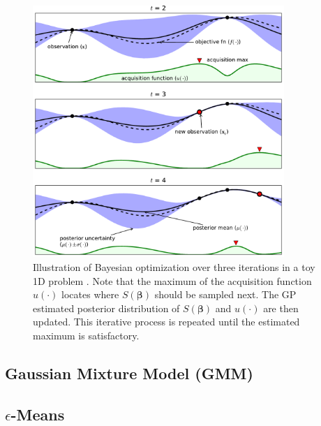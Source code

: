 \begin{figure}
\centering
\includegraphics[width=0.85\textwidth]{figures/ml/toyGPtext3.pdf}
\caption{
Illustration of Bayesian optimization over three iterations in a toy 1D problem \cite{Brochu2010}.
Note that the maximum of the acquisition function $u\left(\cdot\right)$
locates where $S\left(\bm{\beta}\right)$ should be sampled next.
The GP estimated posterior distribution of $S\left(\bm{\beta}\right)$
and $u\left(\cdot\right)$ are then updated.
This iterative process is repeated until the estimated maximum is satisfactory.
}
\label{fig:additional:unsupervised:BO:BO_ex}
\end{figure}


\subsection{Gaussian Mixture Model (GMM)}
\label{additional:unsupervised:GMM}

\subsection{\texorpdfstring{$\epsilon$}{epsilon}-Means}
\label{additional:unsupervised:epsilonMean}

